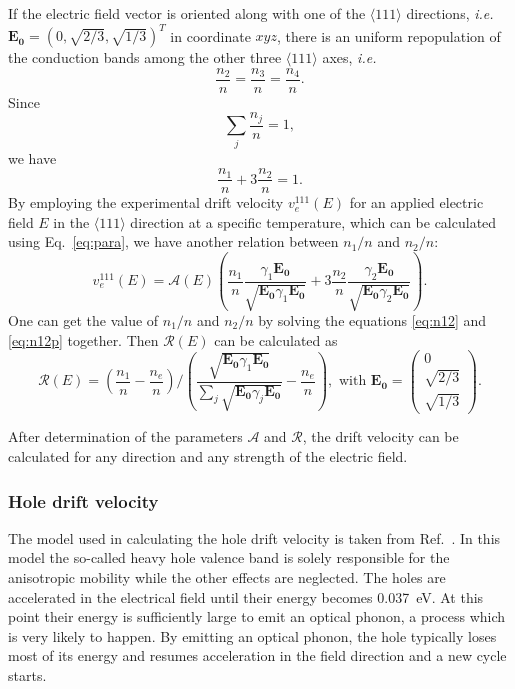 If the electric field vector is oriented along with one of the $\langle111\rangle$ directions, \textit{i.e.} $\mathbf{E_{0}} = (0,\sqrt{2/3},\sqrt{1/3})^{T}$ in coordinate $xyz$, there is an uniform repopulation of the conduction bands among the other three $\langle111\rangle$ axes, \textit{i.e.}
\begin{equation}
  \label{eq:n111}
  \frac{n_{2}}{n} = \frac{n_{3}}{n} = \frac{n_{4}}{n}.
\end{equation}
Since
\begin{equation}
  \label{eq:nsum}
  \displaystyle \sum_{j}\frac{n_{j}}{n} = 1,
\end{equation}
we have
\begin{equation}
  \label{eq:n12}
  \frac{n_{1}}{n} + 3\frac{n_{2}}{n}= 1.
\end{equation}
By employing the experimental drift velocity $v_{e}^{111}(E)$ for an applied electric field $E$ in the $\langle111\rangle$ direction at a specific temperature, which can be calculated using Eq.~\ref{eq:para}, we have another relation between $n_{1}/n$ and $n_{2}/n$:
\begin{equation}
  \label{eq:n12p}
  v_{e}^{111}(E) =  \mathcal{A}(E) \left(  \frac{n_{1}}{n} \frac{\gamma_{1}\mathbf{E_{0}}}         {\sqrt{\mathbf{E_{0}}\gamma_{1}\mathbf{E_{0}}}} +  3\frac{n_{2}}{n} \frac{\gamma_{2}\mathbf{E_{0}}}         {\sqrt{\mathbf{E_{0}}\gamma_{2}\mathbf{E_{0}}}} \right).
\end{equation}
One can get the value of $n_{1}/n$ and $n_{2}/n$ by solving the equations \ref{eq:n12} and \ref{eq:n12p} together. Then $\mathcal{R}(E)$ can be calculated as
\begin{equation}
  \label{eq:re}
  \mathcal{R}(E) = \left( \frac{n_{1}}{n} - \frac{n_{e}}{n} \right) / \left( \frac{\sqrt{\mathbf{E_{0}}\gamma_{1}\mathbf{E_{0}}}}
    {\sum_{j}\sqrt{\mathbf{E_{0}}\gamma_{j}\mathbf{E_{0}}}} -                           \frac{n_{e}}{n} \right), \mbox{ with } \mathbf{E_{0}} = \left( \begin{array}{c} 
  0\\ \sqrt{2/3}\\\sqrt{1/3} \end{array} \right).
\end{equation}

After determination of the parameters $\mathcal{A}$ and $\mathcal{R}$, the drift velocity can be calculated for any direction and any strength of the electric field.

\subsubsection{Hole drift velocity}
\label{sec:hole}
The model used in calculating the hole drift velocity is taken from Ref.~\cite{bart}. In this model the so-called heavy hole valence band is solely responsible for the anisotropic mobility while the other effects are neglected. The holes are accelerated in the electrical field until their energy becomes 0.037~eV. At this point their energy is sufficiently large to emit an optical phonon, a process which is very likely to happen. By emitting an optical phonon, the hole typically loses most of its energy and resumes acceleration in the field direction and a new cycle starts. 

